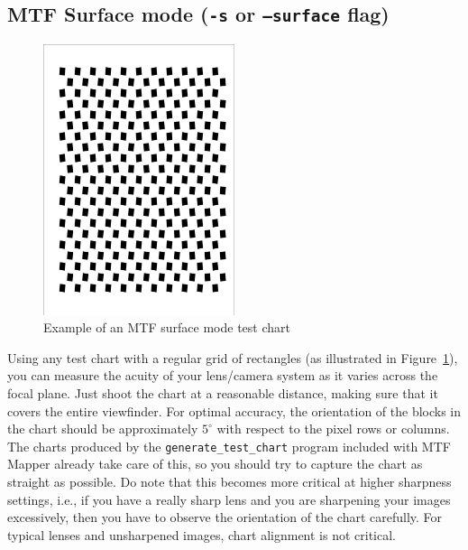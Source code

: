 \documentclass[a4paper]{article}
\begin{document}
\subsection{MTF Surface mode (\texttt{-s} or \texttt{--surface} flag)}
\label{sec:surface_mode}
%
\begin{figure}
\centering
\includegraphics[width=0.5\textwidth,angle=90]{figures/mtf_surface_test_chart.pdf}
\caption{Example of an MTF surface mode test chart}
\label{fig:surface_test_chart}
\end{figure}
%
Using any test chart with a regular grid of rectangles (as illustrated in
Figure~\ref{fig:surface_test_chart}), you can measure the acuity of your
lens/camera system as it varies across the focal plane. Just shoot the chart
at a reasonable distance, making sure that it covers the entire viewfinder.
For optimal accuracy, the orientation of the blocks in the chart should be
approximately $5^\circ$ with respect to the pixel rows or columns.
The charts produced by the \texttt{generate\_test\_chart} program included
with MTF Mapper already take care of this, so you should try to capture the
chart as straight as possible. Do note that this becomes more critical at
higher sharpness settings, i.e., if you have a really sharp lens and you are
sharpening your images excessively, then you have to observe the orientation
of the chart carefully. For typical lenses and unsharpened images, 
chart alignment is not critical.
\end{document}
